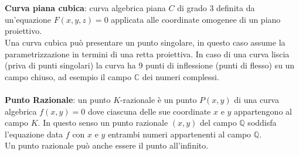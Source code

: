 \documentclass[a4paper,12pt]{tesiinfo}
\begin{document}
\\\\
%
%
%
\textbf{Curva piana cubica}: curva algebrica piana $C$ di grado 3 definita da un'equazione $F(x, y, z) = 0$ applicata alle coordinate omogenee di un piano proiettivo. 
\\
Una curva cubica pu\`o presentare un punto singolare, in questo caso assume la parametrizzazione in termini di una retta proiettiva. In caso di una curva liscia (priva di punti singolari) la curva ha 9 punti di inflessione (punti di flesso) su un campo chiuso, ad esempio il campo $\mathbb{C}$ dei numeri complessi. 
\\\\
%
%
%
\textbf{Punto Razionale}: un punto $K$-razionale \`e un punto $P(x, y)$ di una curva algebrica $f(x, y)=0$ dove ciascuna delle sue coordinate $x$ e $y$ appartengono al campo $K$. In questo senso un punto razionale $(x, y)$ del campo $\mathbb{Q}$ soddisfa l'equazione data $f$ con $x$ e $y$ entrambi numeri appartenenti al campo $\mathbb{Q}$. 
\\
Un punto razionale pu\`o anche essere il punto all'infinito.
\\\\
%
%
%
\\\\
%
%
%
%
%
%
%
%
%
%
%
%
%
\end{document}
